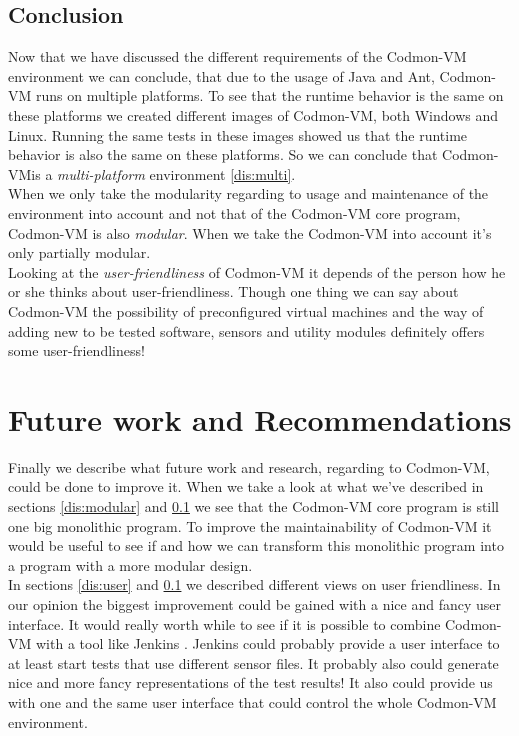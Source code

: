 \documentclass{article}
\newcommand{\project}{Codmon-VM}
\begin{document}
\subsection{Conclusion}
\label{dis:conclusion}
Now that we have discussed the different requirements of the \project{} environment we can conclude, that due to the usage of Java and Ant, \project{} runs on multiple platforms. To see that the runtime behavior is 
the same on these platforms we created different images of \project{}, both Windows and Linux. Running the same tests in these images showed us that the runtime behavior is also the same on these platforms. So
we can conclude that \project is a \emph{multi-platform} environment \ref{dis:multi}.\\

\noindent When we only take the modularity regarding to usage and maintenance of the environment into account and not that of the \project{} core program, \project{} is also \emph{modular}. 
When we take the \project{} into account it's only partially modular.\\

\noindent Looking at the \emph{user-friendliness} of \project{} it depends of the person how he or she thinks about 
user-friendliness. Though one thing we can say about \project{} the possibility of preconfigured virtual machines and the way of adding new to be tested software, sensors and utility modules definitely 
offers some user-friendliness!

\newpage
\section{Future work and Recommendations}
\label{sec:future}
Finally we describe what future work and research, regarding to \project{}, could be done to improve it. When we take a look at what we've described in sections \ref{dis:modular} and 
\ref{dis:conclusion} we see that the \project{} core program is still one big monolithic program. To improve the maintainability of \project{} it would be useful to see if and how we can transform this monolithic 
program into a program with a more modular design.\\

\noindent In sections \ref{dis:user} and \ref{dis:conclusion} we described different views on user friendliness. In our opinion the biggest improvement could be gained with a nice and fancy user interface. It would 
really worth while to see if it is possible to combine \project{} with a tool like Jenkins \cite{JenkinsDoc}. Jenkins could probably provide a user interface to at least start tests that use 
different sensor files. It probably also could generate nice and more fancy representations of the test results! It also could provide us with one and the same user interface that could control the whole \project{} 
environment.\\
\end{document}

